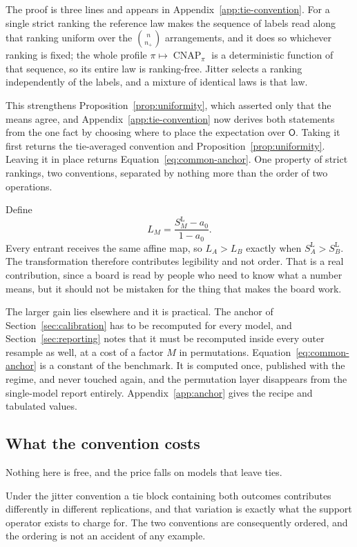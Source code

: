 \documentclass[11pt]{article}
\newcommand{\CNAP}{\operatorname{CNAP}}
\newcommand{\Rank}{\mathsf{O}}
\newcommand{\SLead}{S^{\mathrm{L}}}
\theoremstyle{remark}
\begin{document}
The proof is three lines and appears in Appendix~\ref{app:tie-convention}. For a single strict ranking the reference law makes the sequence of labels read along that ranking uniform over the $\binom{n}{n_+}$ arrangements, and it does so whichever ranking is fixed; the whole profile $\pi\mapsto\CNAP_\pi$ is a deterministic function of that sequence, so its entire law is ranking-free. Jitter selects a ranking independently of the labels, and a mixture of identical laws is that law.

This strengthens Proposition~\ref{prop:uniformity}, which asserted only that the means agree, and Appendix~\ref{app:tie-convention} now derives both statements from the one fact by choosing where to place the expectation over $\Rank$. Taking it first returns the tie-averaged convention and Proposition~\ref{prop:uniformity}. Leaving it in place returns Equation~\eqref{eq:common-anchor}. One property of strict rankings, two conventions, separated by nothing more than the order of two operations.

Define
\begin{equation}
L_M
=
\frac{\SLead_M-a_0}{1-a_0}.
\label{eq:leaderboard}
\end{equation}
Every entrant receives the same affine map, so $L_A>L_B$ exactly when $\SLead_A>\SLead_B$. The transformation therefore contributes legibility and not order. That is a real contribution, since a board is read by people who need to know what a number means, but it should not be mistaken for the thing that makes the board work.

The larger gain lies elsewhere and it is practical. The anchor of Section~\ref{sec:calibration} has to be recomputed for every model, and Section~\ref{sec:reporting} notes that it must be recomputed inside every outer resample as well, at a cost of a factor $M$ in permutations. Equation~\eqref{eq:common-anchor} is a constant of the benchmark. It is computed once, published with the regime, and never touched again, and the permutation layer disappears from the single-model report entirely. Appendix~\ref{app:anchor} gives the recipe and tabulated values.

\subsection{What the convention costs}
\label{sec:jitter-cost}

Nothing here is free, and the price falls on models that leave ties.

Under the jitter convention a tie block containing both outcomes contributes differently in different replications, and that variation is exactly what the support operator exists to charge for. The two conventions are consequently ordered, and the ordering is not an accident of any example.
\end{document}
